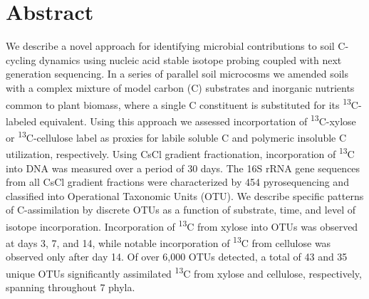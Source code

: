 \section{Abstract} 
We describe a novel approach for identifying microbial contributions to soil C-cycling dynamics using nucleic acid stable isotope probing coupled with next generation sequencing. In a series of parallel soil microcosms we amended soils with a complex mixture of model carbon (C) substrates and inorganic nutrients common to plant biomass, where a single C constituent is substituted for its \textsuperscript{13}C-labeled equivalent. Using this approach we assessed incorportation of \textsuperscript{13}C-xylose or \textsuperscript{13}C-cellulose label as proxies for labile soluble C and polymeric insoluble C utilization, respectively. Using CsCl gradient fractionation, incorporation of \textsuperscript{13}C into DNA was measured over a period of 30 days. The 16S rRNA gene sequences from all CsCl gradient fractions were characterized by 454 pyrosequencing and classified into Operational Taxonomic Units (OTU). We describe specific patterns of C-assimilation by discrete OTUs as a function of substrate, time, and level of isotope incorporation. Incorporation of \textsuperscript{13}C from xylose into OTUs was observed at days 3, 7, and 14, while notable incorporation of \textsuperscript{13}C from cellulose was observed only after day 14. Of over 6,000 OTUs detected, a total of 43 and 35 unique OTUs significantly assimilated \textsuperscript{13}C from xylose and cellulose, respectively, spanning throughout 7 phyla.  

